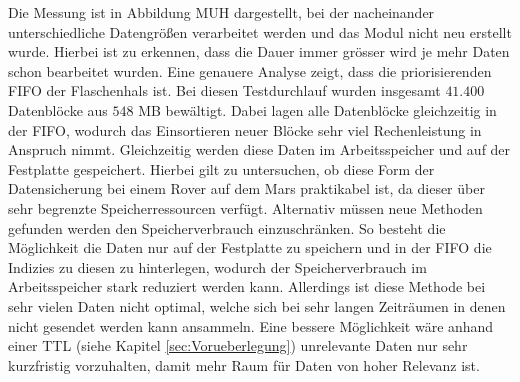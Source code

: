 Die Messung ist in Abbildung MUH dargestellt, bei der nacheinander
unterschiedliche Datengrößen verarbeitet werden und das Modul nicht neu erstellt
wurde. Hierbei ist zu erkennen, dass die Dauer immer grösser wird
je mehr Daten schon bearbeitet wurden. Eine genauere Analyse zeigt, dass die
priorisierenden \gls{FIFO} der Flaschenhals ist. Bei diesen Testdurchlauf
wurden insgesamt $41.400$ Datenblöcke aus $548$ MB bewältigt. Dabei lagen alle
Datenblöcke gleichzeitig in der \gls{FIFO}, wodurch das Einsortieren neuer
Blöcke sehr viel Rechenleistung in Anspruch nimmt. Gleichzeitig werden diese
Daten im Arbeitsspeicher und auf der Festplatte gespeichert. Hierbei gilt zu
untersuchen, ob diese Form der Datensicherung bei einem Rover auf dem
Mars praktikabel ist, da dieser über sehr begrenzte Speicherressourcen verfügt.
Alternativ müssen neue Methoden gefunden werden den Speicherverbrauch
einzuschränken. So besteht die Möglichkeit die Daten nur auf der Festplatte
zu speichern und in der \gls{FIFO} die Indizies zu diesen zu hinterlegen,
wodurch der Speicherverbrauch im Arbeitsspeicher stark reduziert werden kann.
Allerdings ist diese Methode bei sehr vielen Daten nicht optimal, welche sich
bei sehr langen Zeiträumen in denen nicht gesendet werden kann ansammeln.
Eine bessere Möglichkeit wäre anhand einer \gls{TTL} (siehe Kapitel
\ref{sec:Vorueberlegung}) unrelevante Daten nur sehr kurzfristig vorzuhalten, damit mehr Raum für Daten
von hoher Relevanz ist.
